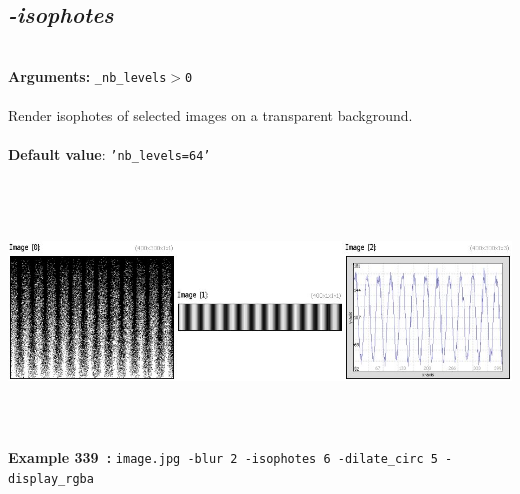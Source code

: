\documentclass[a4paper,11pt,twoside]{book}
\begin{document}
\subsection{\emph{-isophotes} }\vspace*{-0.5em}
~\\\textbf{Arguments: } 
{\small \texttt{\_nb\_levels$>$0}}\\~\\
Render isophotes of selected images on a transparent background.
~\\~\\\textbf{Default value}: {\small \texttt{'nb\_levels=64'}}
\begin{center}\includegraphics[keepaspectratio=true,height=7cm,width=\textwidth]{img/gmic_def339.jpg}\\
{\footnotesize \textbf{Example 339~:} \texttt{image.jpg -blur 2 -isophotes 6 -dilate\_circ 5 -display\_rgba}}
\end{center}
\end{document}
